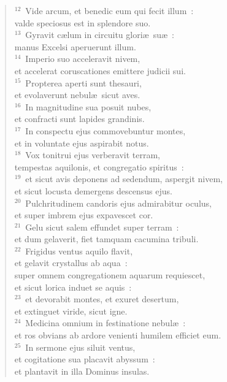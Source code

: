 \begin{flushleft}\begin{verse}${}^{12}$~Vide arcum, et benedic eum qui fecit illum~:\\ valde speciosus est in splendore suo.\\
${}^{13}$~Gyravit c\ae lum in circuitu glori\ae\ su\ae~:\\ manus Excelsi aperuerunt illum.\\
${}^{14}$~Imperio suo acceleravit nivem,\\ et accelerat coruscationes emittere judicii sui.\\
${}^{15}$~Propterea aperti sunt thesauri,\\ et evolaverunt nebul\ae\ sicut aves.\\
${}^{16}$~In magnitudine sua posuit nubes,\\ et confracti sunt lapides grandinis.\\
${}^{17}$~In conspectu ejus commovebuntur montes,\\ et in voluntate ejus aspirabit notus.\\
${}^{18}$~Vox tonitrui ejus verberavit terram,\\ tempestas aquilonis, et congregatio spiritus~:\\
${}^{19}$~et sicut avis deponens ad sedendum, aspergit nivem,\\ et sicut locusta demergens descensus ejus.\\
${}^{20}$~Pulchritudinem candoris ejus admirabitur oculus,\\ et super imbrem ejus expavescet cor.\\
${}^{21}$~Gelu sicut salem effundet super terram~:\\ et dum gelaverit, fiet tamquam cacumina tribuli.\\
${}^{22}$~Frigidus ventus aquilo flavit,\\ et gelavit crystallus ab aqua~:\\ super omnem congregationem aquarum requiescet,\\ et sicut lorica induet se aquis~:\\
${}^{23}$~et devorabit montes, et exuret desertum,\\ et extinguet viride, sicut igne.\\
${}^{24}$~Medicina omnium in festinatione nebul\ae~:\\ et ros obvians ab ardore venienti humilem efficiet eum.\\
${}^{25}$~In sermone ejus siluit ventus,\\ et cogitatione sua placavit abyssum~:\\ et plantavit in illa Dominus insulas.\\

\end{verse}
\end{flushleft}
